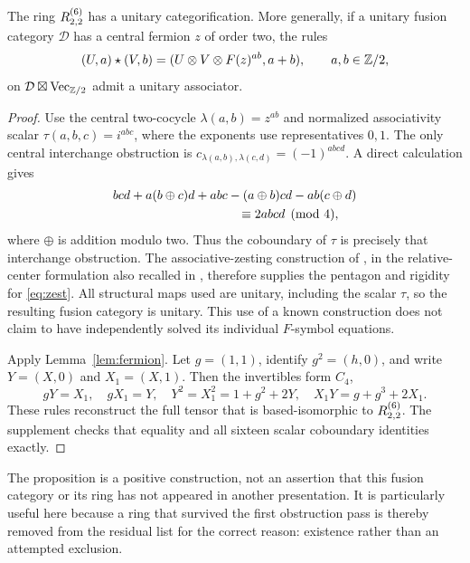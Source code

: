 \begin{proposition}\label{prop:zest}
The ring $R^{(6)}_{2,2}$ has a unitary categorification. More generally, if
a unitary fusion category $\mathcal D$ has a central fermion $z$ of
order two, the rules
\begin{equation}\label{eq:zest}
 (U,a)\star(V,b)=(U\otimes V\otimes F(z)^{ab},a+b),
 \qquad a,b\in\mathbb Z/2,
\end{equation}
on $\mathcal D\boxtimes\operatorname{Vec}_{\mathbb Z/2}$ admit a unitary associator.
\end{proposition}
\begin{proof}
Use the central two-cocycle $\lambda(a,b)=z^{ab}$ and normalized
associativity scalar
$\tau(a,b,c)=i^{abc}$, where the exponents use representatives
$0,1$. The only central interchange obstruction is
$c_{\lambda(a,b),\lambda(c,d)}=(-1)^{abcd}$. A direct calculation gives
\begin{align*}
 &bcd+a(b\mathbin\oplus c)d+abc
 -(a\mathbin\oplus b)cd-ab(c\mathbin\oplus d)\\
 &\hspace{35mm}\equiv 2abcd\pmod4,
\end{align*}
where $\oplus$ is addition modulo two. Thus the coboundary of $\tau$
is precisely that interchange obstruction. The associative-zesting
construction of \cite[Definition~3.2, Proposition~3.4]{DGP}, in the
relative-center formulation also recalled in \cite[Definition~2.1]{AGM},
therefore supplies the pentagon and rigidity for \eqref{eq:zest}.
All structural maps used are unitary, including the scalar $\tau$, so
the resulting fusion category is unitary. This use of a known
construction does not claim to have independently solved its individual
$F$-symbol equations.

Apply Lemma~\ref{lem:fermion}. Let $g=(1,1)$, identify
$g^2=(h,0)$, and write $Y=(X,0)$ and $X_1=(X,1)$.
Then the invertibles form $C_4$,
\[
 gY=X_1,\quad gX_1=Y,\quad
 Y^2=X_1^2=1+g^2+2Y,\quad
 X_1Y=g+g^3+2X_1.
\]
These rules reconstruct the full tensor that is based-isomorphic to
$R^{(6)}_{2,2}$. The supplement checks that equality and all sixteen scalar
coboundary identities exactly.
\end{proof}

The proposition is a positive construction, not an assertion that this
fusion category or its ring has not appeared in another presentation.
It is particularly useful here because a ring that survived the first
obstruction pass is thereby removed from the residual list for the
correct reason: existence rather than an attempted exclusion.

